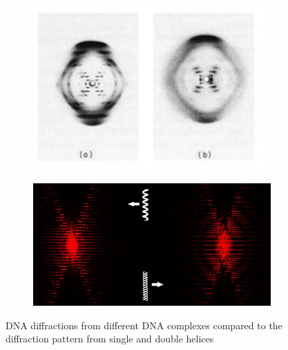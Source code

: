 \begin{figure}[H]
    \centering
    \begin{subfigure}{0.9\columnwidth}
        \centering
        \includegraphics[width=\columnwidth]{figures/DNA diffraction.png}
        \label{fig:DNA diff}
    \end{subfigure}
    \begin{subfigure}{0.9\columnwidth}
        \centering
        \includegraphics[width=\columnwidth]{figures/Single Double.jpg}
        \label{helix diff}
    \end{subfigure}
    \caption{DNA diffractions from different DNA complexes compared to the diffraction pattern from single and double helices}
    \label{fig:Single double DNA}
\end{figure}
